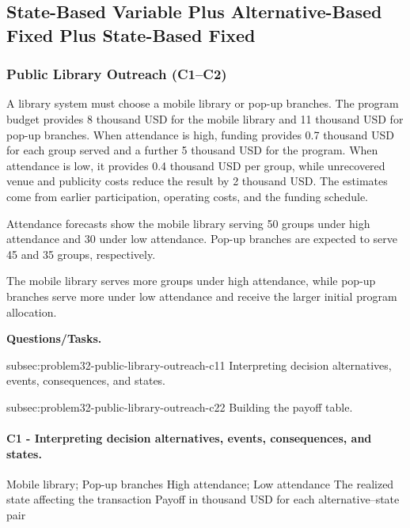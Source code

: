 	
	\subsection{State-Based Variable Plus Alternative-Based Fixed Plus State-Based Fixed}
	\label{sec:state-based-variable-payoff-plus-alternative-based-fixed-payoff-plus-state-based-fixed-payoff}



	\subsubsection{Public Library Outreach (C1--C2)}
	\label{sec:problem32-public-library-outreach-c1-c2}
	
	A library system must choose a mobile library or pop-up branches. The program budget provides 8 thousand USD for the mobile library and 11 thousand USD for pop-up branches. When attendance is high, funding provides 0.7 thousand USD for each group served and a further 5 thousand USD for the program. When attendance is low, it provides 0.4 thousand USD per group, while unrecovered venue and publicity costs reduce the result by 2 thousand USD. The estimates come from earlier participation, operating costs, and the funding schedule.
	
	Attendance forecasts show the mobile library serving 50 groups under high attendance and 30 under low attendance. Pop-up branches are expected to serve 45 and 35 groups, respectively.
	
	The mobile library serves more groups under high attendance, while pop-up branches serve more under low attendance and receive the larger initial program allocation.

	\textbf{Questions/Tasks.}
	\begin{enumerate}
	\CriterionTask
	{subsec:problem32-public-library-outreach-c1}{1}
	{Interpreting decision alternatives, events, consequences, and states.}

	\CriterionTask
	{subsec:problem32-public-library-outreach-c2}{2}
	{Building the payoff table.}
	\end{enumerate}

\paragraph*{C1 - Interpreting decision alternatives, events, consequences, and states.}
	\label{subsec:problem32-public-library-outreach-c1}
	\DecisionElementsTable
	{Mobile library; Pop-up branches}
	{High attendance; Low attendance}
	{The realized state affecting the transaction}
	{Payoff in thousand USD for each alternative--state pair}

